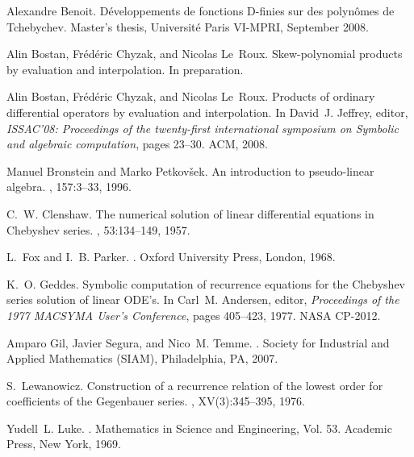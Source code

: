 \documentclass{amsart}
\theoremstyle{definition}
\begin{document}
\begin{thebibliography}{10}

Alexandre Benoit.
\newblock D{\'e}veloppements de fonctions {D}-finies sur des polyn{\^o}mes de
  {T}chebychev.
\newblock Master's thesis, Universit{\'e} Paris VI-MPRI, September 2008.

Alin Bostan, Fr{\'e}d{\'e}ric Chyzak, and Nicolas Le~Roux.
\newblock Skew-polynomial products by evaluation and interpolation.
\newblock In preparation.

Alin Bostan, Fr{\'e}d{\'e}ric Chyzak, and Nicolas Le~Roux.
\newblock Products of ordinary differential operators by evaluation and
  interpolation.
\newblock In David~J. Jeffrey, editor, {\em ISSAC'08: Proceedings of the
  twenty-first international symposium on Symbolic and algebraic computation},
  pages 23--30. ACM, 2008.

Manuel Bronstein and Marko Petkov{\v s}ek.
\newblock An introduction to pseudo-linear algebra.
, 157:3--33, 1996.

C.~W. Clenshaw.
\newblock The numerical solution of linear differential equations in
  {C}hebyshev series.
,
  53:134--149, 1957.

L.~Fox and I.~B. Parker.
.
\newblock Oxford University Press, London, 1968.


\vfill\eject

K.~O. Geddes.
\newblock Symbolic computation of recurrence equations for the {C}hebyshev
  series solution of linear {ODE}'s.
\newblock In Carl~M. Andersen, editor, {\em Proceedings of the 1977 MACSYMA
  User's Conference}, pages 405--423, 1977.
\newblock NASA CP-2012.


Amparo Gil, Javier Segura, and Nico~M. Temme.
.
\newblock Society for Industrial and Applied Mathematics (SIAM), Philadelphia,
  PA, 2007.

S.~Lewanowicz.
\newblock Construction of a recurrence relation of the lowest order for
  coefficients of the {G}egenbauer series.
, XV(3):345--395, 1976.

Yudell~L. Luke.
.
\newblock Mathematics in Science and Engineering, Vol. 53. Academic Press, New
  York, 1969.


\end{thebibliography}
\end{document}
